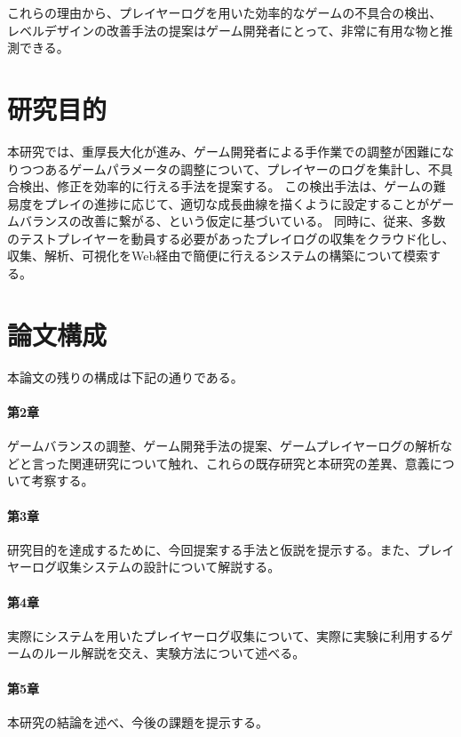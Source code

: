 これらの理由から、プレイヤーログを用いた効率的なゲームの不具合の検出、 レベルデザインの改善手法の提案はゲーム開発者にとって、非常に有用な物と推測できる。


\section{研究目的}
本研究では、重厚長大化が進み、ゲーム開発者による手作業での調整が困難になりつつあるゲームパラメータの調整について、プレイヤーのログを集計し、不具合検出、修正を効率的に行える手法を提案する。
この検出手法は、ゲームの難易度をプレイの進捗に応じて、適切な成長曲線を描くように設定することがゲームバランスの改善に繋がる、という仮定に基づいている。
同時に、従来、多数のテストプレイヤーを動員する必要があったプレイログの収集をクラウド化し、収集、解析、可視化をWeb経由で簡便に行えるシステムの構築について模索する。

\section{論文構成}
本論文の残りの構成は下記の通りである。
\paragraph{第2章}
ゲームバランスの調整、ゲーム開発手法の提案、ゲームプレイヤーログの解析などと言った関連研究について触れ、これらの既存研究と本研究の差異、意義について考察する。
\paragraph{第3章}
研究目的を達成するために、今回提案する手法と仮説を提示する。また、プレイヤーログ収集システムの設計について解説する。
\paragraph{第4章}
実際にシステムを用いたプレイヤーログ収集について、実際に実験に利用するゲームのルール解説を交え、実験方法について述べる。
\paragraph{第5章}
本研究の結論を述べ、今後の課題を提示する。
